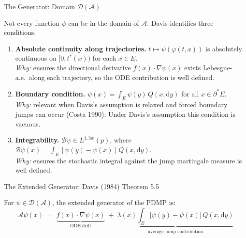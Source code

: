 \documentclass[aspectratio=169]{beamer}
\begin{document}
\begin{frame}{The Generator: Domain $\mathcal{D}(\mathcal{A})$}

  Not every function $\psi$ can be in the domain of $\mathcal{A}$. Davis
  identifies three conditions.

  \bigskip
  \begin{enumerate}
    \setlength\itemsep{10pt}

    \item \textbf{Absolute continuity along trajectories.}
          $t \mapsto \psi(\varphi(t,x))$ is absolutely continuous on
          $[0,t^*(x))$ for each $x \in E$.\\
          \textit{Why:} ensures the directional derivative
          $f(x)\cdot\nabla\psi(x)$ exists Lebesgue-a.e.\ along each
          trajectory, so the ODE contribution is well defined.

    \item \textbf{Boundary condition.}
          $\psi(x) = \int_E \psi(y)\,Q(x,\mathrm{d}y)$ for all
          $x \in \partial^* E$.\\
          \textit{Why:} relevant when Davis's assumption is relaxed and
          forced boundary jumps can occur (Costa 1990). Under Davis's
          assumption this condition is vacuous.

    \item \textbf{Integrability.}
          $\mathcal{B}\psi \in L^{1,\mathrm{loc}}(p)$, where
          $\mathcal{B}\psi(x) = \int_E [\psi(y)-\psi(x)]\,Q(x,\mathrm{d}y)$.\\
          \textit{Why:} ensures the stochastic integral against the jump
          martingale measure is well defined.

  \end{enumerate}

\end{frame}

\begin{frame}{The Extended Generator: Davis (1984) Theorem 5.5}

  \vfill

  \begin{theorem}
    For $\psi \in \mathcal{D}(\mathcal{A})$, the extended generator of the
    PDMP is:
    \[
      \boxed{
        \mathcal{A}\psi(x) \;=\;
        \underbrace{f(x)\cdot\nabla\psi(x)}_{\text{ODE drift}}
        \;+\;
        \underbrace{\lambda(x)\int_E\bigl[\psi(y)-\psi(x)\bigr]\,Q(x,\mathrm{d}y)}_{\text{average jump contribution}}
      }
    \]
  \end{theorem}
\vfill
\end{frame}
\end{document}
